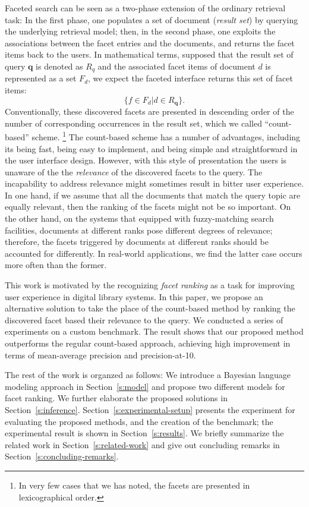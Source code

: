 Faceted search can be seen as a two-phase extension of the ordinary retrieval
task: In the first phase, one populates a set of document (\emph{result set})
by querying the underlying retrieval model; then, in the second phase, one
exploits the associations between the facet entries and the documents, and
returns the facet items back to the users.  In mathematical terms, supposed
that the result set of query $\mathbf{q}$ is denoted as $R_{q}$ and the
associated facet items of document $d$ is represented as a set $F_d$, we expect
the faceted interface returns this set of facet items: \[ \{ f \in F_d | d \in
R_{\mathbf{q}} \}.  \] Conventionally, these discovered facets are presented in
descending order of the number of corresponding occurrences in the result set,
which we called ``count-based'' scheme.  \footnote{In very few cases that we
has noted, the facets are presented in lexicographical order.}  The count-based
scheme has a number of advantages, including its being fast, being easy to
implement, and being simple and straightforward in the user interface design.
However, with this style of presentation the users is unaware of the the
\emph{relevance} of the discovered facets to the query.  The incapability to
address relevance might sometimes result in bitter user experience.  In one
hand, if we assume that all the documents that match the query topic are
equally relevant, then the ranking of the facets might not be so important.  On
the other hand, on the systems that equipped with fuzzy-matching search
facilities, documents at different ranks pose different degrees of relevance;
therefore, the facets triggered by documents at different ranks should be
accounted for differently.  In real-world applications, we find the latter case
occurs more often than the former. 

This work is motivated by the recognizing \emph{facet ranking} as a task for
improving user experience in digital library systems.  In this paper, we
propose an alternative solution to take the place of the count-based method by
ranking the discovered facet based their relevance to the query.  We conducted
a series of experiments on a custom benchmark.  The result shows that our
proposed method outperforms the regular count-based approach, achieving high
improvement in terms of mean-average precision and precision-at-10.

The rest of the work is organzed as follows: We introduce a Bayesian language
modeling approach in Section~\ref{s:model} and propose two different models for
facet ranking.  We further elaborate the proposed solutions in
Section~\ref{s:inference}.  Section~\ref{s:experimental-setup} presents the
experiment for evaluating the proposed methods, and the creation of the
benchmark; the experimental result is shown in Section~\ref{s:results}.  We
briefly summarize the related work in Section~\ref{s:related-work} and give out
concluding remarks in Section~\ref{s:concluding-remarks}.

